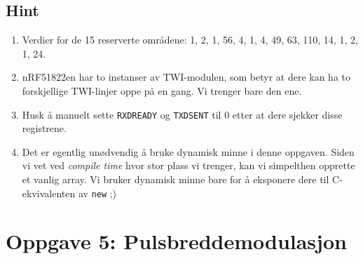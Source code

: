 \documentclass[11pt,a4paper]{article}
\begin{document}
\subsection{Hint}
\begin{enumerate}
\item Verdier for de 15 reserverte områdene: 1, 2, 1, 56, 4, 1, 4, 49, 63, 110, 14, 1, 2, 1, 24.
\item nRF51822en har to instanser av TWI-modulen, som betyr at dere kan ha to forskjellige TWI-linjer oppe på en gang. Vi trenger bare den ene.
\item Husk å manuelt sette \texttt{RXDREADY} og \texttt{TXDSENT} til 0 etter at dere sjekker disse registrene.
\item Det er egentlig unødvendig å bruke dynamisk minne i denne oppgaven. Siden vi vet ved \textit{compile time} hvor stor plass vi trenger, kan vi simpelthen opprette et vanlig array. Vi bruker dynamisk minne bare for å eksponere dere til C-ekvivalenten av \texttt{new} ;)
\end{enumerate}

\section{Oppgave 5: Pulsbreddemodulasjon}
\end{document}

